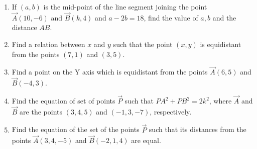 \begin{enumerate}[label=\thesubsection.\arabic*, ref=\thesubsection.\theenumi]
\item If $(a, b)$ is the mid-point of the line segment joining the point $\vec{A}(10, -6)\text{ and }\vec{B}(k, 4)$ and $a-2b=18$,  find the value of $a, b$ and the distance $AB$.
\item Find a relation between $x$ and $y$ such that the point $(x,y)$ is equidistant from the points $(7,1)$ and $(3,5)$.
\item Find a point on the Y axis which is equidistant from the points $\vec{A}(6,5)$ and $\vec{B}(-4,3)$.
\item Find the equation of set of points $\vec{P}$ such that $PA^2+PB^2=2k^2$, where $\vec{A}$ and $\vec{B}$ are the points $(3,4,5)$ and $(-1,3,-7)$, respectively.
\item Find the equation of the set of the points $\vec{P}$ such that its distances from the points $\vec{A}(3,4,-5)$ and $\vec{B}(-2,1,4)$ are equal.
\end{enumerate}
